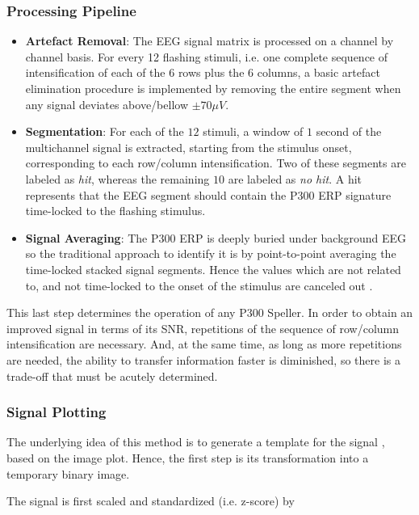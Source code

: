 \documentclass[entropy,article,submit,moreauthors,pdftex,10pt,a4paper]{mdpi}
\begin{document}
\subsubsection{Processing Pipeline} \label{Pipeline}

\begin{itemize}
\item \textbf{Artefact Removal}: The EEG signal matrix is processed on a channel by channel basis.   For every 12 flashing stimuli, i.e. one complete sequence of intensification of each of the $6$ rows plus the $6$ columns, a basic artefact elimination procedure is implemented by removing the entire segment when any signal deviates above/bellow $ \pm 70 \mu V $.
\item \textbf{Segmentation}: For each of the $12$ stimuli,  a window of $1$ second of the multichannel signal is extracted, starting from the stimulus onset, corresponding to each row/column intensification.  Two of these segments are labeled as \textit{hit}, whereas the remaining $10$ are labeled as \textit{no hit}.  A hit represents that the EEG segment should contain the P300 ERP signature time-locked to the flashing stimulus. 
\item \textbf{Signal Averaging}:  The P300 ERP is deeply buried under background EEG so the traditional approach to identify it is by point-to-point averaging the time-locked stacked signal segments.  Hence the values which are not related to, and not time-locked to the onset of the stimulus are canceled out \citep{Liang2008}. 
\end{itemize}

This last step determines the operation of any P300 Speller.  In order to obtain an improved signal in terms of its SNR, repetitions of the sequence of row/column intensification are necessary.  And, at the same time, as long as more repetitions are needed, the ability to transfer information faster is diminished, so there is a trade-off that must be acutely determined.

\subsubsection{Signal Plotting} \label{Plot}

The underlying idea of this method is to generate a template for the signal \citep{Ramele2016},  based on the image plot.  Hence, the first step is its transformation into a temporary binary image.

The signal is first scaled and standardized (i.e. z-score) by 
\end{document}
